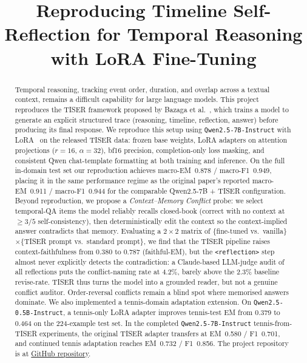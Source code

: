 \documentclass[conference]{IEEEtran}
\title{Reproducing Timeline Self-Reflection for Temporal Reasoning with LoRA Fine-Tuning}
\author{
\IEEEauthorblockN{
Gabriele Adorni s349308,
Berk Calisir s347896
Alessandro Casadei s349386, \\
Taha Atabay Cetin s349501,
Elias Noorzad s314515
}
\IEEEauthorblockA{
Politecnico di Torino\\
Deep Natural Language Processing\\
}
}
\begin{document}
\maketitle

\begin{abstract}
Temporal reasoning, tracking event order, duration, and overlap across a textual context, remains a difficult capability for large language models. This project reproduces the TISER framework proposed by Bazaga et al.~\cite{bazaga2025tiser}, which trains a model to generate an explicit structured trace (reasoning, timeline, reflection, answer) before producing its final response. We reproduce this setup using \texttt{Qwen2.5-7B-Instruct} with LoRA~\cite{hu2022lora} on the released TISER data: frozen base weights, LoRA adapters on attention projections ($r{=}16$, $\alpha{=}32$), bf16 precision, completion-only loss masking, and consistent Qwen chat-template formatting at both training and inference. On the full in-domain test set our reproduction achieves macro-EM~0.878 / macro-F1~0.949, placing it in the same performance regime as the original paper's reported macro-EM~0.911 / macro-F1~0.944 for the comparable Qwen2.5-7B + TISER configuration. Beyond reproduction, we propose a \emph{Context--Memory Conflict} probe: we select temporal-QA items the model reliably recalls closed-book (correct with no context at ${\geq}3/5$ self-consistency), then deterministically edit the context so the context-implied answer contradicts that memory. Evaluating a $2{\times}2$ matrix of \{fine-tuned vs.\ vanilla\}${\times}$\{TISER prompt vs.\ standard prompt\}, we find that the TISER pipeline raises context-faithfulness from 0.380 to 0.787 (faithful-EM), but the \texttt{<reflection>} step almost never explicitly detects the contradiction: a Claude-based LLM-judge audit of all reflections puts the conflict-naming rate at 4.2\%, barely above the 2.3\% baseline revise-rate. TISER thus turns the model into a grounded reader, but not a genuine conflict auditor. Order-reversal conflicts remain a blind spot where memorised answers dominate.
We also implemented a tennis-domain adaptation extension. On \texttt{Qwen2.5-0.5B-Instruct}, a tennis-only LoRA adapter improves tennis-test EM from 0.379 to 0.464 on the 224-example test set. In the completed \texttt{Qwen2.5-7B-Instruct} tennis-from-TISER experiments, the original TISER adapter transfers at EM~0.580 / F1~0.701, and continued tennis adaptation reaches EM~0.732 / F1~0.856.
The project repository is at \href{https://github.com/thestbobo/tiser_temporal_reasoning_extension}{GitHub repository}.
\end{abstract}
\end{document}
